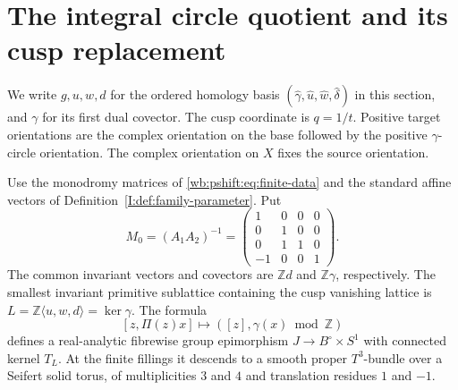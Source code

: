 \section{The integral circle quotient and its cusp replacement}\hypertarget{tag-02OO}{}\label{mapsI:circle-quotient}

\begin{definition}\hypertarget{tag-IP06}{}\label{I:def:circle-quotient-conventions}
We write $g,u,w,d$ for the ordered homology basis
$(\widehat\gamma,\widehat u,\widehat w,\widehat\delta)$ in this
section, and $\gamma$ for its first dual covector. The cusp coordinate is
$q=1/t$.  Positive target orientations are the complex orientation
on the base followed by the positive $\gamma$-circle orientation.
The complex orientation on $X$ fixes the source orientation.
\end{definition}

\begin{proposition}\hypertarget{tag-02PA}{}\label{mapsI:src:A.1.1}

Use the monodromy matrices of \eqref{wb:pshift:eq:finite-data} and the
standard affine vectors of Definition~\ref{I:def:family-parameter}. Put
\[
 M_0=(A_1A_2)^{-1}=
 \begin{pmatrix}1&0&0&0\\0&1&0&0\\0&1&1&0\\-1&0&0&1\end{pmatrix}.
\]
The common invariant vectors and covectors are $\mathbb Zd$ and
$\mathbb Z\gamma$, respectively.  The smallest invariant primitive
sublattice containing the cusp vanishing lattice is
$L=\mathbb Z\langle u,w,d\rangle=\ker\gamma$.
The formula
\[
 [z,\Pi(z)x]\longmapsto([z],\gamma(x)\bmod\mathbb Z)
 \label{mapsI:quotient-eq-1}
\]
defines a real-analytic fibrewise group epimorphism
$J\longrightarrow B^\circ\times S^1$ with connected kernel $T_L$.
At the finite fillings it descends to a smooth proper $T^3$-bundle
over a Seifert solid torus, of multiplicities $3$ and $4$ and
translation residues $1$ and $-1$.
\end{proposition}



